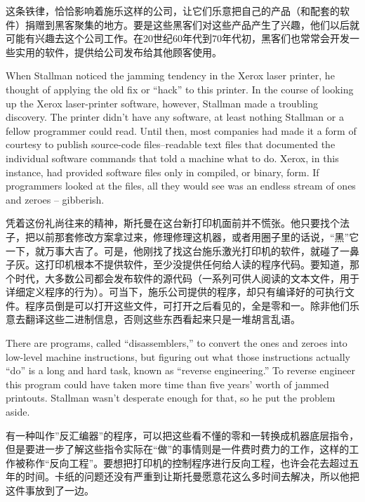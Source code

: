 \ifdefined\chs
这条铁律，恰恰影响着施乐这样的公司，让它们乐意把自己的产品（和配套的软件）捐赠到黑客聚集的地方。要是这些黑客们对这些产品产生了兴趣，他们以后就可能有兴趣去这个公司工作。在20世纪60年代到70年代初，黑客们也常常会开发一些实用的软件，提供给公司发布给其他顾客使用。
\fi

\ifdefined\eng
When Stallman noticed the jamming tendency in the Xerox laser printer, he thought of applying the old fix or ``hack'' to this printer. In the course of looking up the Xerox laser-printer software, however, Stallman made a troubling discovery. The printer didn't have any software, at least nothing Stallman or a fellow programmer could read. Until then, most companies had made it a form of courtesy to publish source-code files--readable text files that documented the individual software commands that told a machine what to do. Xerox, in this instance, had provided software files only in compiled, or binary, form. If programmers looked at the files, all they would see was an endless stream of ones and zeroes -- gibberish.
\fi

\ifdefined\chs
凭着这份礼尚往来的精神，斯托曼在这台新打印机面前并不慌张。他只要找个法子，把以前那套修改方案拿过来，修理修理这机器，或者用圈子里的话说，“黑”它一下，就万事大吉了。可是，他刚找了找这台施乐激光打印机的软件，就碰了一鼻子灰。这打印机根本不提供软件，至少没提供任何给人读的程序代码。要知道，那个时代，大多数公司都会发布软件的源代码（一系列可供人阅读的文本文件，用于详细定义程序的行为）。可当下，施乐公司提供的程序，却只有编译好的可执行文件。程序员倒是可以打开这些文件，可打开之后看见的，全是零和一。除非他们乐意去翻译这些二进制信息，否则这些东西看起来只是一堆胡言乱语。
\fi

\ifdefined\eng
There are programs, called ``disassemblers,'' to convert the ones and zeroes into low-level machine instructions, but figuring out what those instructions actually ``do'' is a long and hard task, known as ``reverse engineering.''  To reverse engineer this program could have taken more time than five years' worth of jammed printouts.  Stallman wasn't desperate enough for that, so he put the problem aside.
\fi

\ifdefined\chs
有一种叫作”反汇编器”的程序，可以把这些看不懂的零和一转换成机器底层指令，但是要进一步了解这些指令实际在“做”的事情则是一件费时费力的工作，这样的工作被称作“反向工程”。要想把打印机的控制程序进行反向工程，也许会花去超过五年的时间。卡纸的问题还没有严重到让斯托曼愿意花这么多时间去解决，所以他把这件事放到了一边。
\fi

